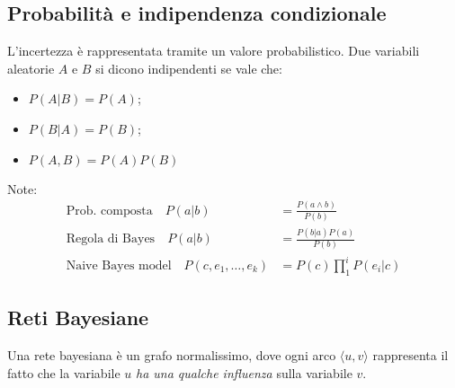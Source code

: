 \documentclass[a4paper, 11pt]{article}
\begin{document}
\subsection{Probabilità e indipendenza condizionale}
L'incertezza è rappresentata tramite un valore probabilistico. 
Due variabili aleatorie $A$ e $B$ si dicono indipendenti se vale che: \begin{itemize}
	\item $P(A \vert B) = P(A) $;
	\item $P(B \vert A) = P(B) $;
	\item $P(A,B) = P(A)P(B)$
\end{itemize}


Note:\begin{align*}
	\text{Prob. composta} \quad P(a \vert b) &= \frac{P(a \wedge b)}{P(b)} \\
	\text{Regola di Bayes} \quad P(a \vert b) &= \frac{P(b \vert a) P(a)}{P(b)} \\
	\text{Naive Bayes model} \quad P(c, e_1, \dots, e_k) &= P(c) \prod_{1}^{i} P(e_i \vert c)
\end{align*}

\subsection{Reti Bayesiane}
Una rete bayesiana è un grafo normalissimo, dove ogni arco $\langle u, v\rangle$ rappresenta il fatto che la variabile $u$ \emph{ha una qualche influenza} sulla variabile $v$.
\end{document}

